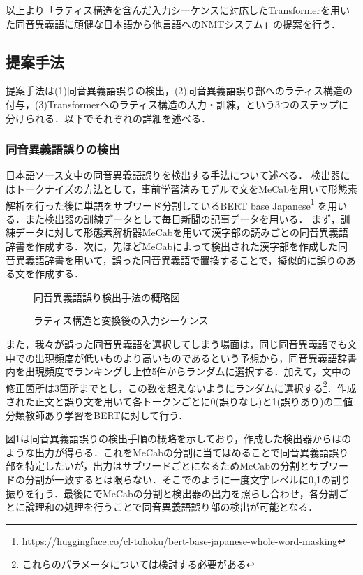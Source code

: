 \documentclass[a4j,10.5pt, twocolumn]{jarticle}
\begin{document}
以上より「ラティス構造を含んだ入力シーケンスに対応したTransformerを用いた同音異義語に頑健な日本語から他言語へのNMTシステム」の提案を行う．

\subsection{提案手法}
提案手法は(1)同音異義語誤りの検出，(2)同音異義語誤り部へのラティス構造の付与，(3)Transformerへのラティス構造の入力・訓練，という3つのステップに分けられる．以下でそれぞれの詳細を述べる．
\subsubsection{同音異義語誤りの検出}
日本語ソース文中の同音異義語誤りを検出する手法について述べる．
検出器にはトークナイズの方法として，事前学習済みモデルで文をMeCabを用いて形態素解析を行った後に単語をサブワード分割しているBERT base Japanese\footnote{https://huggingface.co/cl-tohoku/bert-base-japanese-whole-word-masking}
を用いる．また検出器の訓練データとして毎日新聞の記事データを用いる．
まず，訓練データに対して形態素解析器MeCabを用いて漢字部の読みごとの同音異義語辞書を作成する．次に，先ほどMeCabによって検出された漢字部を作成した同音異義語辞書を用いて，誤った同音異義語で置換することで，擬似的に誤りのある文を作成する．

\begin{figure}[h]
   \centering
    
    \caption{同音異義語誤り検出手法の概略図}
\end{figure}

\begin{figure}[h]
   \centering
    
    \caption{ラティス構造と変換後の入力シーケンス}
\end{figure}

また，我々が誤った同音異義語を選択してしまう場面は，同じ同音異義語でも文中での出現頻度が低いものより高いものであるという予想から，同音異義語辞書内を出現頻度でランキングし上位5件からランダムに選択する．加えて，文中の修正箇所は3箇所までとし，この数を超えないようにランダムに選択する\footnote{これらのパラメータについては検討する必要がある}．作成された正文と誤り文を用いて各トークンごとに0(誤りなし)と1(誤りあり)の二値分類教師あり学習をBERTに対して行う．

図1は同音異義語誤りの検出手順の概略を示しており，作成した検出器からはのような出力が得らる．これをMeCabの分割に当てはめることで同音異義語誤り部を特定したいが，出力はサブワードごとになるためMeCabの分割とサブワードの分割が一致するとは限らない．そこでのように一度文字レベルに0,1の割り振りを行う．最後にでMeCabの分割と検出器の出力を照らし合わせ，各分割ごとに論理和の処理を行うことで同音異義語誤り部の検出が可能となる．
\end{document}
